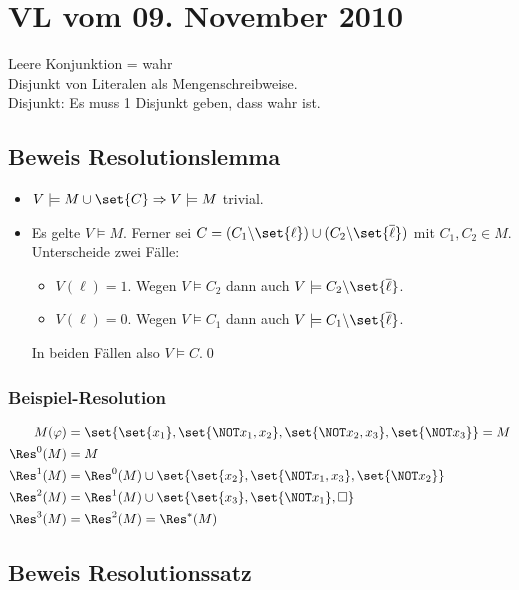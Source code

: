 \section{VL vom 09. November 2010}
Leere Konjunktion = wahr\\
Disjunkt von Literalen als Mengenschreibweise.\\
Disjunkt: Es muss 1 Disjunkt geben, dass wahr ist.\\

\subsection{Beweis Resolutionslemma}

\begin{itemize}
  \item $V \models  M \cup \set{C} \Rightarrow V \models  M$ trivial.
  \item Es gelte $V\models M$. Ferner sei $C=(C_1\backslash \set{\ell}) \cup
  (C_2\backslash \set{\overline{\ell}})$ mit $C_1,C_2 \in M$. Unterscheide zwei
  Fälle:
  \begin{itemize}
    \item $V(\ell) = 1$. Wegen $V\models C_2$ dann auch $V\models C_2\backslash \set{\overline{\ell}}$.
    \item $V(\ell) = 0$. Wegen $V\models C_1$ dann auch $V\models C_1\backslash \set{\overline{\ell}}$.
  \end{itemize}
  In beiden Fällen also $V\models C$.\qed
\end{itemize}

\subsubsection{Beispiel-Resolution}

\begin{align}
  M(\varphi) &= \set{\set{x_1}, \set{\NOT x_1, x_2}, \set{\NOT x_2, x_3}, \set{\NOT x_3}} = M \\
  \Res^0(M)   &= M \\
  \Res^1(M)   &= \Res^0(M) \cup \set{\set{x_2}, \set{\NOT x_1, x_3}, \set{\NOT x_2}} \\
  \Res^2(M)   &= \Res^1(M) \cup \set{\set{x_3}, \set{\NOT x_1}, \square} \\
  \Res^3(M)   &= \Res^2(M) = \Res^*(M)
\end{align}

\subsection{Beweis Resolutionssatz}


